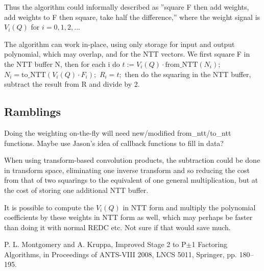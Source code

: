 \documentclass[a4paper]{article}
\begin{document}
Thus the algorithm could informally described as ''square F then add weights,
add weights to F then square, take half the difference,'' where the weight
signal is $V_i(Q)$ for $i = 0, 1, 2, \ldots$

The algorithm can work in-place, using only storage for input and output
polynomial, which may overlap, and for the NTT vectors. 
We first square F in the NTT buffer N, then 
for each i do 
  $t := V_i(Q) \cdot \mbox{from\_NTT}(N_i);$ 
  $N_i = \mbox{to\_NTT}(V_i(Q) \cdot F_i);$
  $R_i = t;$
then do the squaring in the NTT buffer, subtract the result from R and 
divide by 2.

\subsection{Ramblings}
Doing the weighting on-the-fly will need new/modified from\_ntt/to\_ntt
functions. Maybe use Jason's idea of callback functions to fill in data?

When using transform-based convolution products, the subtraction could be done
in transform space, eliminating one inverse transform and so reducing the
cost from that of two squarings to the equivalent of one general
multiplication, but at the cost of storing one additional NTT buffer. 

It is possible to compute the $V_i(Q)$ in NTT form and multiply the polynomial
coefficients by these weights in NTT form as well, which may perhaps be faster 
than doing it with normal REDC etc. Not sure if that would save
much.

\begin{thebibliography}{9}
   P. L. Montgomery and A. Kruppa, Improved Stage 2 to P$\pm$1 Factoring Algorithms, in Proceedings of ANTS-VIII 2008, LNCS 5011, Springer, pp. 180--195.
\end{thebibliography}
\end{document}
